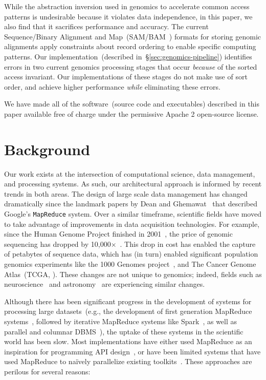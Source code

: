 \documentclass{acm_proc_article-sp}
\begin{document}
While the abstraction inversion used in genomics to accelerate common access patterns is undesirable
because it violates data independence, in this paper, we also find that it sacrifices performance and
accuracy. The current Sequence/Binary Alignment and Map~(SAM/BAM~\cite{li09}) formats for storing
genomic alignments apply constraints about record ordering to enable specific computing patterns. Our
implementation~(described in~\S\ref{sec:genomics-pipeline}) identifies errors in two current genomics
processing stages that occur \emph{because} of the sorted access invariant. Our implementations of
these stages do not make use of sort order, and achieve higher performance \emph{while} eliminating
these errors.

We have made all of the software~(source code and executables) described in this paper available free
of charge under the permissive Apache 2 open-source license.

\section{Background}
\label{sec:background}

Our work exists at the intersection of computational science, data management, and processing
systems. As such, our architectural approach is informed by recent trends in both areas. The design of
large scale data management has changed dramatically since the landmark papers by Dean and
Ghemawat~\cite{dean04, dean08} that described Google's \texttt{MapReduce} system. Over a
similar timeframe, scientific fields have moved to take advantage of improvements in data acquisition
technologies. For example, since the Human Genome Project finished in 2001~\cite{lander01}, the price
of genomic sequencing has dropped by 10,000$\times$~\cite{nhgri}. This drop in cost has enabled the
capture of petabytes of sequence data, which has (in turn) enabled significant population genomics
experiments like the 1000 Genomes project~\cite{siva08}, and The Cancer Genome Atlas~(TCGA,
\cite{weinstein13}). These changes are not unique to genomics; indeed, fields such as
neuroscience~\cite{cunningham14} and astronomy~\cite{sdss2000, lsst2008, turk11} are experiencing similar changes.

Although there has been significant progress in the development of systems for processing large
datasets~(e.g., the development of first generation MapReduce systems~\cite{dean04}, followed by
iterative MapReduce systems like Spark~\cite{zaharia10}, as well as parallel and columnar
DBMS~\cite{abadi06, lamb12}), the uptake of these systems in the scientific world has been slow.
Most implementations have either used MapReduce as an inspiration for programming API
design~\cite{mckenna10}, or have been limited systems that have used MapReduce to na\"{i}vely
parallelize existing toolkits~\cite{langmead09, schatz09}. These approaches are perilous for several
reasons:
\end{document}
